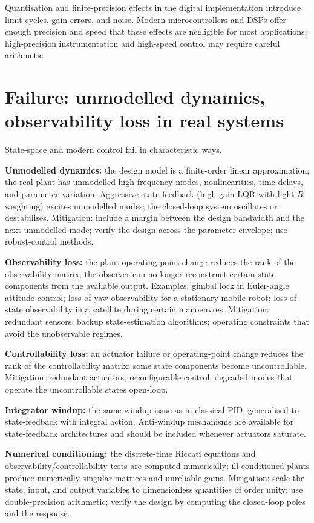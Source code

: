 Quantisation and finite-precision effects in the digital implementation introduce limit cycles, gain errors, and noise. Modern microcontrollers and DSPs offer enough precision and speed that these effects are negligible for most applications; high-precision instrumentation and high-speed control may require careful arithmetic.

\section{Failure: unmodelled dynamics, observability loss in real systems}

State-space and modern control fail in characteristic ways.

\textbf{Unmodelled dynamics:} the design model is a finite-order linear approximation; the real plant has unmodelled high-frequency modes, nonlinearities, time delays, and parameter variation. Aggressive state-feedback (high-gain LQR with light $R$ weighting) excites unmodelled modes; the closed-loop system oscillates or destabilises. Mitigation: include a margin between the design bandwidth and the next unmodelled mode; verify the design across the parameter envelope; use robust-control methods.

\textbf{Observability loss:} the plant operating-point change reduces the rank of the observability matrix; the observer can no longer reconstruct certain state components from the available output. Examples: gimbal lock in Euler-angle attitude control; loss of yaw observability for a stationary mobile robot; loss of state observability in a satellite during certain manoeuvres. Mitigation: redundant sensors; backup state-estimation algorithms; operating constraints that avoid the unobservable regimes.

\textbf{Controllability loss:} an actuator failure or operating-point change reduces the rank of the controllability matrix; some state components become uncontrollable. Mitigation: redundant actuators; reconfigurable control; degraded modes that operate the uncontrollable states open-loop.

\textbf{Integrator windup:} the same windup issue as in classical PID, generalised to state-feedback with integral action. Anti-windup mechanisms are available for state-feedback architectures and should be included whenever actuators saturate.

\textbf{Numerical conditioning:} the discrete-time Riccati equations and observability/controllability tests are computed numerically; ill-conditioned plants produce numerically singular matrices and unreliable gains. Mitigation: scale the state, input, and output variables to dimensionless quantities of order unity; use double-precision arithmetic; verify the design by computing the closed-loop poles and the response.

